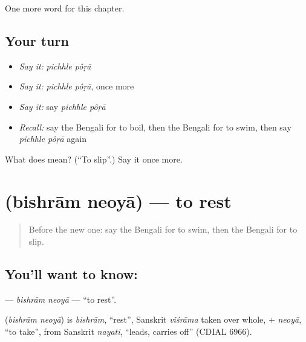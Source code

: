 \begin{grammarlens}[title={What you've built}]
One more word for this chapter.
\end{grammarlens}

\subsection*{Your turn}
\begin{itemize}
\raggedright
  \item \emph{Say it:} \emph{pichhle pôṛā}
  \item \emph{Say it:} \emph{pichhle pôṛā}, once more
  \item \emph{Say it:} say \emph{pichhle pôṛā}
  \item \emph{Recall:} say the Bengali for to boil, then the Bengali for to swim, then say \emph{pichhle pôṛā} again
\end{itemize}

\begin{tcolorbox}[breakable,colback=teal!4,colframe=teal!35!black,title={Before you move on}]
What does   mean? (\textquotedblleft{}To slip\textquotedblright{}.) Say it once more.
\end{tcolorbox}
\section[\texorpdfstring{\bn{বিশ্রাম} \bn{নেওয়া} (bishrām neoyā)}{বিশ্রাম নেওয়া (bishrām neoyā)}]{  (bishrām neoyā) — to rest}

\label{lesson:BN-C149-bishram-neoya}



\begin{quote}
Before the new one: say the Bengali for to swim, then the Bengali for to slip.
\end{quote}

\subsection*{You'll want to know:  }
\textbf{ } — \emph{bishrām neoyā} — \textquotedblleft{}to rest\textquotedblright{}.

\begin{cousinweb}
\textbf{ } (\emph{bishrām neoyā}) is \emph{bishrām}, \textquotedblleft{}rest\textquotedblright{}, Sanskrit \emph{viśrāma} taken over whole, + \emph{neoyā}, \textquotedblleft{}to take\textquotedblright{}, from Sanskrit \emph{nayati}, \textquotedblleft{}leads, carries off\textquotedblright{} (CDIAL 6966).
\end{cousinweb}

